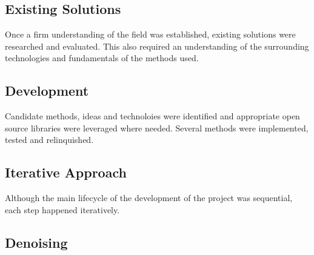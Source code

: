 \documentclass[a4paper, 12pt]{report}
\begin{document}
\subsection{Existing Solutions}
Once a firm understanding of the field was established, existing solutions were researched and evaluated. This also required an understanding of the surrounding technologies and fundamentals of the methods used.

\subsection{Development}
Candidate methods, ideas and technoloies were identified and appropriate open source libraries were leveraged where needed. Several methods were implemented, tested and relinquished.

\subsection{Iterative Approach}
Although the main lifecycle of the development of the project was sequential, each step happened iteratively.


\subsection{Denoising}
\end{document}
